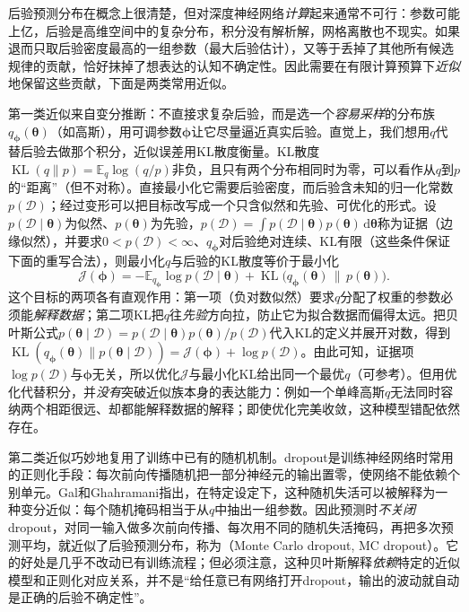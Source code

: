 后验预测分布在概念上很清楚，但对深度神经网络\emph{计算}起来通常不可行：参数可能上亿，后验是高维空间中的复杂分布，积分没有解析解，网格离散也不现实。如果退而只取后验密度最高的一组参数（最大后验估计），又等于丢掉了其他所有候选规律的贡献，恰好抹掉了想表达的认知不确定性。因此需要在有限计算预算下\emph{近似}地保留这些贡献，下面是两类常用近似。

第一类近似来自变分推断：不直接求复杂后验，而是选一个\emph{容易采样}的分布族$q_{\bm{\phi}}(\bm{\theta})$（如高斯），用可调参数$\bm{\phi}$让它尽量逼近真实后验。直觉上，我们想用$q$代替后验去做那个积分，近似误差用KL散度衡量。KL散度$\operatorname{KL}(q\|p)=\mathbb E_q\log(q/p)$非负，且只有两个分布相同时为零，可以看作从$q$到$p$的“距离”（但不对称）。直接最小化它需要后验密度，而后验含未知的归一化常数$p(\mathcal D)$；经过变形可以把目标改写成一个只含似然和先验、可优化的形式。设$p(\mathcal D\mid\bm{\theta})$为似然、$p(\bm{\theta})$为先验，$p(\mathcal D)=\int p(\mathcal D\mid\bm\theta)p(\bm\theta)\,\mathrm d\bm\theta$称为证据（边缘似然），并要求$0<p(\mathcal D)<\infty$、$q_{\bm{\phi}}$对后验绝对连续、KL有限（这些条件保证下面的重写合法），则最小化$q$与后验的KL散度等价于最小化
\begin{equation}
 \mathcal J(\bm{\phi})
 =-\mathbb E_{q_{\bm{\phi}}}\log p(\mathcal D\mid\bm{\theta})
   +\operatorname{KL}\bigl(q_{\bm{\phi}}(\bm{\theta})
                    \,\|\,p(\bm{\theta})\bigr).
 \label{eq:reliability-variational-objective}
\end{equation}
这个目标的两项各有直观作用：第一项（负对数似然）要求$q$分配了权重的参数必须能\emph{解释数据}；第二项KL把$q$往\emph{先验}方向拉，防止它为拟合数据而偏得太远。把贝叶斯公式$p(\bm\theta\mid\mathcal D)=p(\mathcal D\mid\bm\theta)p(\bm\theta)/p(\mathcal D)$代入KL的定义并展开对数，得到$\operatorname{KL}(q_{\bm{\phi}}(\bm{\theta})\|p(\bm{\theta}\mid\mathcal D))=\mathcal J(\bm{\phi})+\log p(\mathcal D)$。由此可知，证据项$\log p(\mathcal D)$与$\bm{\phi}$无关，所以优化$\mathcal J$与最小化KL给出同一个最优$q$（可参考）。但用优化代替积分，并\emph{没有}突破近似族本身的表达能力：例如一个单峰高斯$q$无法同时容纳两个相距很远、却都能解释数据的解释；即使优化完美收敛，这种模型错配依然存在。

第二类近似巧妙地复用了训练中已有的随机机制。dropout是训练神经网络时常用的正则化手段：每次前向传播随机把一部分神经元的输出置零，使网络不能依赖个别单元。Gal和Ghahramani指出，在特定设定下，这种随机失活可以被解释为一种变分近似：每个随机掩码相当于从$q$中抽出一组参数。因此预测时\emph{不关闭}dropout，对同一输入做多次前向传播、每次用不同的随机失活掩码，再把多次预测平均，就近似了后验预测分布，称为（Monte Carlo dropout, MC dropout）。它的好处是几乎不改动已有训练流程；但必须注意，这种贝叶斯解释\emph{依赖}特定的近似模型和正则化对应关系，并不是“给任意已有网络打开dropout，输出的波动就自动是正确的后验不确定性”。

